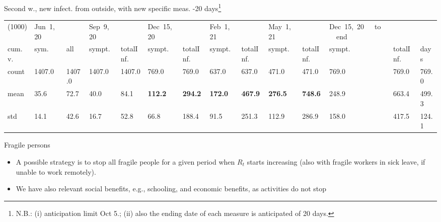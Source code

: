 \documentclass[9pt]{beamer}
\begin{document}
\begin{frame}{Second w., new infect. from outside, with new specific meas. -20 days\footnote{N.B.: (i) anticipation limit Oct 5.; (ii) also the ending date of each measure is anticipated of 20 days.}}
\begin{table}[H]
\center
\tiny
\begin{tabular}{p{0.4cm}p{0.3cm}p{0.3cm}p{0.3cm}p{0.3cm}p{0.3cm}p{0.3cm}p{0.3cm}p{0.3cm}p{0.3cm}p{0.3cm}p{0.3cm}p{0.3cm}p{0.4cm}}
\toprule
(1000) &  Jun~1,~20 & &  Sep~9,~20 & & Dec~15,~20 & & Feb~1,~21 & & May~1,~21 & & Dec~15,~20~~~to~~~end   \\
cum.~v. &  sym. &  all &  sympt. &  totalInf. &  sympt. &  totalInf. &  sympt. &  totalInf. &  sympt. &  totalInf. &  sympt. &  totalInf.  & days\\
\midrule
count &   1407.0 &                     1407.0 &   1407.0 &                     1407.0 &    769.0 &                      769.0 &    637.0 &                      637.0 &    471.0 &                      471.0 &              769.0 &                   769.0 &  769.0 \\
mean  &     35.6 &                       72.7 &     40.0 &                       84.1 &    \textbf{{\color{red}112.2}} &                     \textbf{{\color{red} 294.2}} &    \textbf{172.0} &                      \textbf{467.9} &    \textbf{276.5} &                      \textbf{748.6} &              248.9 &                   663.4 &  499.3 \\
std   &     14.1 &                       42.6 &     16.7 &                       52.8 &     66.8 &                      188.4 &     91.5 &                      251.3 &    112.9 &                      286.9 &               158.0 &                   417.5 &  124.1 \\
\bottomrule
\end{tabular}

\label{selForceWave2Contr2M-20Tab}
\end{table}


\end{frame}

\begin{frame}{Fragile persons}

\begin{itemize}


\item
A possible strategy is to stop all fragile people for a given period when $R_t$ starts increasing (also with fragile workers in sick leave, if unable to work remotely).

\item
We have also relevant social benefits, e.g., schooling, and economic benefits, as activities do not stop


\end{itemize}

\end{frame}
\end{document}
